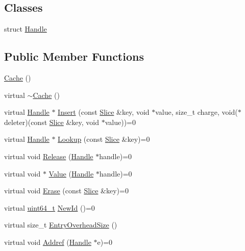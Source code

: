 \subsection*{Classes}
\begin{DoxyCompactItemize}
\item 
struct \hyperlink{structleveldb_1_1_cache_1_1_handle}{Handle}
\end{DoxyCompactItemize}
\subsection*{Public Member Functions}
\begin{DoxyCompactItemize}
\item 
\hyperlink{classleveldb_1_1_cache_ac9b129b21ba8eda181645fc3f6a8dfe6}{Cache} ()
\item 
virtual \hyperlink{classleveldb_1_1_cache_a1369f94b24a31099443f714b8b8ab527}{$\sim$\+Cache} ()
\item 
virtual \hyperlink{structleveldb_1_1_cache_1_1_handle}{Handle} $\ast$ \hyperlink{classleveldb_1_1_cache_af0b55b7fa0e64184fa62e0dbe9ba9eae}{Insert} (const \hyperlink{classleveldb_1_1_slice}{Slice} \&key, void $\ast$value, size\+\_\+t charge, void($\ast$deleter)(const \hyperlink{classleveldb_1_1_slice}{Slice} \&key, void $\ast$value))=0
\item 
virtual \hyperlink{structleveldb_1_1_cache_1_1_handle}{Handle} $\ast$ \hyperlink{classleveldb_1_1_cache_af90785205182a25cf741dc13a48d76cb}{Lookup} (const \hyperlink{classleveldb_1_1_slice}{Slice} \&key)=0
\item 
virtual void \hyperlink{classleveldb_1_1_cache_a712618c8bf3bfa48b7bab1fbc23c3002}{Release} (\hyperlink{structleveldb_1_1_cache_1_1_handle}{Handle} $\ast$handle)=0
\item 
virtual void $\ast$ \hyperlink{classleveldb_1_1_cache_a454920df8e68917adcf011dfb3538661}{Value} (\hyperlink{structleveldb_1_1_cache_1_1_handle}{Handle} $\ast$handle)=0
\item 
virtual void \hyperlink{classleveldb_1_1_cache_af833a38763598253338de37aba079db6}{Erase} (const \hyperlink{classleveldb_1_1_slice}{Slice} \&key)=0
\item 
virtual \hyperlink{stdint_8h_aaa5d1cd013383c889537491c3cfd9aad}{uint64\+\_\+t} \hyperlink{classleveldb_1_1_cache_ae2d79bfe747fc6c165c77398cc31e125}{New\+Id} ()=0
\item 
virtual size\+\_\+t \hyperlink{classleveldb_1_1_cache_acdda83b8d887f453dcab37344d5f9e02}{Entry\+Overhead\+Size} ()
\item 
virtual void \hyperlink{classleveldb_1_1_cache_ae1c46291f5e7259d36ed6676d57cc610}{Addref} (\hyperlink{structleveldb_1_1_cache_1_1_handle}{Handle} $\ast$e)=0
\end{DoxyCompactItemize}
